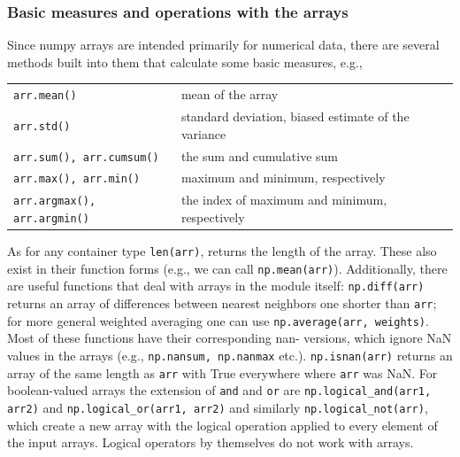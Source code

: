 \documentclass{article}
\newcommand{\ls}[1]{\lstinline{#1}}
\begin{document}
\subsubsection{Basic measures and operations with the arrays}
Since numpy arrays are intended primarily for numerical data, there are several methods built into them that calculate some basic measures, e.g.,

\begin{tabular}{lll}
\ls{arr.mean()} & mean of the array\\
\ls{arr.std()} & standard deviation, biased estimate of the variance\\
\ls{arr.sum(), arr.cumsum()} & the sum and cumulative sum\\
\ls{arr.max(), arr.min()} & maximum and minimum, respectively\\
\ls{arr.argmax(), arr.argmin()} & the index of maximum and minimum, respectively\\
\end{tabular}

As for any container type \ls{len(arr)}, returns the length of the array. These also exist in their function forms (e.g., we can call \ls{np.mean(arr)}). Additionally, there are useful functions that deal with arrays in the module itself: \ls{np.diff(arr)} returns an array of differences between nearest neighbors one shorter than \ls{arr}; for more general weighted averaging one can use \ls{np.average(arr, weights)}. Most of these functions have their corresponding nan- versions, which ignore NaN values in the arrays (e.g., \ls{np.nansum, np.nanmax} etc.). \ls{np.isnan(arr)} returns an array of the same length as \ls{arr} with True everywhere where \ls{arr} was NaN. For boolean-valued arrays the extension of \ls{and} and \ls{or} are \ls{np.logical_and(arr1, arr2)} and \ls{np.logical_or(arr1, arr2)} and similarly \ls{np.logical_not(arr)}, which create a new array with the logical operation applied to every element of the input arrays. Logical operators by themselves do not work with arrays.
\end{document}
